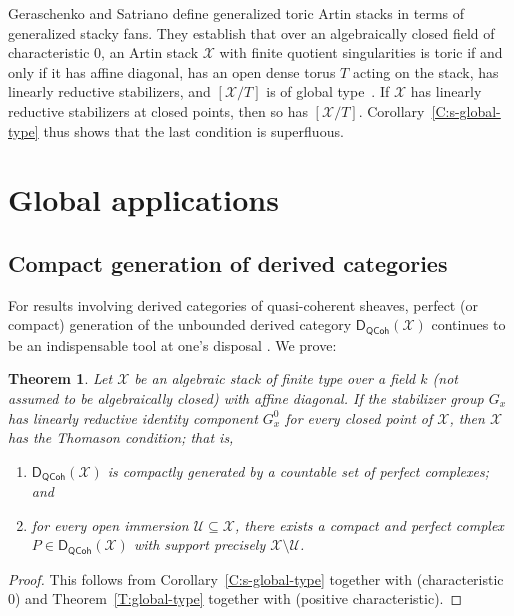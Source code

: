 \documentclass[a4paper]{amsart}
\theoremstyle{plain}
\newtheorem{theorem}{Theorem}[section]
\theoremstyle{definition}
\theoremstyle{remark}
\numberwithin{equation}{section}
\newcommand\cU{\mathcal{U}}
\newcommand\cX{\mathcal{X}}
\newcommand{\QCoh}{\mathsf{QCoh}}
\newcommand{\DCAT}{\mathsf{D}}
\newcommand{\DQCOH}{\DCAT_{\QCoh}}
\begin{document}
Geraschenko and Satriano define generalized toric Artin stacks in terms of generalized stacky fans.
They establish that over an algebraically closed field of characteristic $0$, an Artin stack $\cX$ with finite quotient singularities is toric if and only if it has affine
diagonal, has an open dense torus $T$ acting on the stack, has linearly
reductive stabilizers, and $[\cX/T]$ is of global
type~\cite[Thm.~6.1]{GS-toric-stacks-2,GS-toric-stacks-2-erratum}. If $\cX$ has linearly reductive
stabilizers at closed points, then so has
$[\cX/T]$. Corollary~\ref{C:s-global-type} thus shows that the last condition
is superfluous.



\section{Global applications}\label{S:global_applications}
\subsection{Compact generation of derived categories} \label{A:compact-generation}
For results involving derived categories of quasi-coherent sheaves, perfect (or compact) generation of the unbounded derived category $\DQCOH(\cX)$ continues to be an indispensable tool at one's disposal \cite{neeman_duality,BZFN}.  We prove:  
\begin{theorem}\label{T:compact-generation}
  Let $\cX$ be an algebraic stack of finite type over a field $k$ (not assumed to be algebraically closed) with 
  affine diagonal. If the stabilizer group $G_x$ has linearly reductive
  identity component $G_x^0$ for every closed point of $\cX$, then $\cX$ has the Thomason condition; that is, 
  \begin{enumerate}
  \item $\DQCOH(\cX)$ is compactly generated by a countable set of
    perfect complexes; and
  \item for every open immersion $\cU\subseteq \cX$, there exists a compact and perfect complex $P \in \DQCOH(\cX)$ with support precisely $\cX\setminus \cU$. 
  \end{enumerate}
\end{theorem}

\begin{proof} This follows from
Corollary~\ref{C:s-global-type}
together with \cite[Thm.~B]{perfect_complexes_stacks} (characteristic $0$) and
Theorem~\ref{T:global-type} together with
\cite[Thm.~D]{hallj_dary_alg_groups_classifying} (positive characteristic).
\end{proof}
\end{document}

